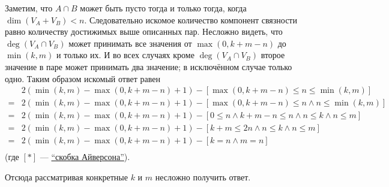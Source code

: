 \documentclass[12pt,a4paper]{article}
\begin{document}
\begin{problem}{97}
        Заметим, что $A \cap B$ может быть пусто тогда и только тогда, когда $\dim(V_A + V_B) < n$. Следовательно искомое количество компонент связности равно количеству достижимых выше описанных пар. Несложно видеть, что $\deg(V_A \cap V_B)$ может принимать все значения от $\max(0, k + m - n)$ до $\min(k, m)$ и только их. И во всех случаях кроме $\deg(V_A \cap V_B)$ второе значение в паре может принимать два значение; в исключённом случае только одно. Таким образом искомый ответ равен
        \begin{align*}
            &2(\min(k, m) - \max(0, k + m - n) + 1) - [\max(0, k + m - n) \leqslant n \leqslant \min(k, m)]\\
            =&2(\min(k, m) - \max(0, k + m - n) + 1) - [\max(0, k + m - n) \leqslant n \wedge n \leqslant \min(k, m)]\\
            =&2(\min(k, m) - \max(0, k + m - n) + 1) - [0 \leqslant n \wedge k + m - n \leqslant n \wedge n \leqslant k \wedge n \leqslant m]\\
            =&2(\min(k, m) - \max(0, k + m - n) + 1) - [k + m \leqslant 2n \wedge n \leqslant k \wedge n \leqslant m]\\
            =&2(\min(k, m) - \max(0, k + m - n) + 1) - [k = n \wedge m = n]\\
        \end{align*}
        (где $[*]$ --- \href{https://ru.wikipedia.org/wiki/\%D0\%A1\%D0\%BA\%D0\%BE\%D0\%B1\%D0\%BA\%D0\%B0_\%D0\%90\%D0\%B9\%D0\%B2\%D0\%B5\%D1\%80\%D1\%81\%D0\%BE\%D0\%BD\%D0\%B0}{``скобка Айверсона''}).

        Отсюда рассматривая конкретные $k$ и $m$ несложно получить ответ.
    \end{problem}
\end{document}
